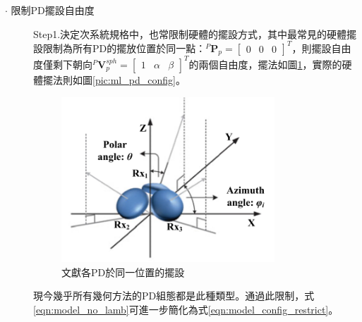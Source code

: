 \begin{description}
        \item[$\cdot$ 限制PD擺設自由度]\hfill
        
        \qquad
        Step1.決定次系統規格中，也常限制硬體的擺設方式，其中最常見的硬體擺設限制為所有PD的擺放位置於同一點：$^P\boldsymbol{P}_p=
        \left[\begin{array}{ccc}0&0&0\end{array}\right]^T$，則擺設自由度僅剩下朝向$^P\boldsymbol{V}_p^{sph} = \left[\begin{array}{ccc}1&\alpha&\beta\end{array}\right]^T$的兩個自由度，擺法如圖\ref{pic:config_orient}，實際的硬體擺法則如圖\ref{pic:ml_pd_config}\cite{case:ml}。
        
        \begin{figure}[htpb]
            \centering
            \includegraphics[width=8cm]{ch2pic/config_orient.png}
            \caption{文獻\cite{case:3d_layers}各PD於同一位置的擺設}
            \label{pic:config_orient}
        \end{figure}

        

        現今幾乎所有幾何方法的PD組態都是此種類型\cite{survey_light2018}。通過此限制，式\ref{eqn:model_no_lamb}可進一步簡化為式\ref{eqn:model_config_restrict}。


\end{description}
